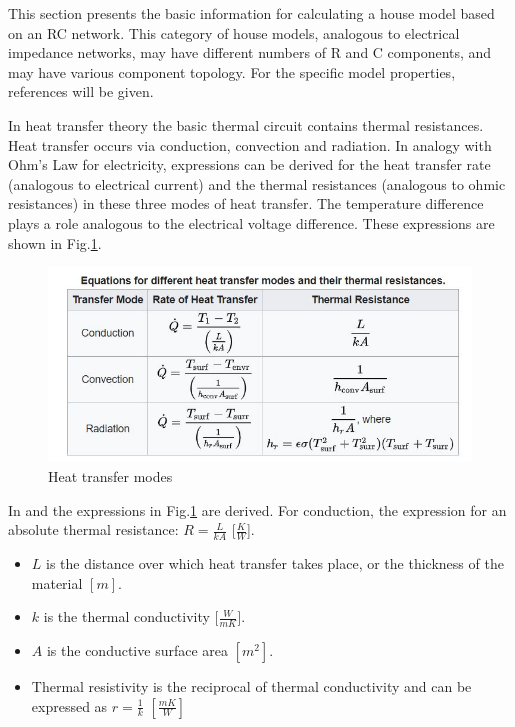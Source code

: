 This section presents the basic information for calculating a house model based on an RC network. This category of house models, analogous to electrical impedance networks, may have different numbers of R and C components, and may have various component topology. For the specific model properties, references will be given.

In heat transfer theory the basic thermal circuit contains thermal resistances. Heat transfer occurs via conduction, convection and radiation. In analogy with Ohm's Law for electricity, expressions can be derived for the heat transfer rate (analogous to electrical current) and the thermal resistances (analogous to ohmic resistances) in these three modes of heat transfer. The temperature difference plays a role analogous to the electrical voltage difference. These expressions are shown in Fig.\ref{table_1}.
\begin{figure}[H]
	\centering
	\includegraphics[width=0.8\columnwidth]{Pictures/heat transfer mode.JPG}
	\caption[Short title]{Heat transfer modes\cite{GIGO}}
	\label{table_1}
\end{figure}
\newpage

In \cite{HTTHERMO} and \cite{FUND} the expressions in Fig.\ref{table_1} are derived.
For conduction, the expression for an absolute thermal resistance:  $R = \frac{L}{kA}$ [$\frac{K}{W}$].

\begin{itemize}
    \item $L$ is the distance over which heat transfer takes place, or the thickness of the material $[m]$.
    \item $k$ is the thermal conductivity  [$\frac{W}{mK}$].
    \item $A$ is the conductive surface area  $[m^2]$.
    \item Thermal resistivity is the reciprocal of thermal conductivity and can be expressed as $r =\frac{1}{k}$ $[\frac{mK}{W}]$

\end{itemize}


